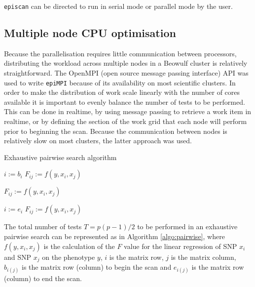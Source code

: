{\tt episcan} can be directed to run in serial mode or parallel mode by the user.


\subsection{Multiple node CPU optimisation}

Because the parallelisation requires little communication between processors, distributing the workload across multiple nodes in a Beowulf cluster is relatively straightforward. The OpenMPI (open source message passing interface) API was used to write {\tt epiMPI} because of its availability on most scientific clusters. In order to make the distribution of work scale linearly with the number of cores available it is important to evenly balance the number of tests to be performed. This can be done in realtime, by using message passing to retrieve a work item in realtime, or by defining the section of the work grid that each node will perform prior to beginning the scan. Because the communication between nodes is relatively slow on most clusters, the latter approach was used.

\begin{algorithm}
\caption{Exhaustive pairwise search algorithm}
\label{algo:pairwise}
\begin{algorithmic}

\STATE $i:= b_i$
\STATE $F_{ij}:= f(y, x_i, x_j)$  
\ENDFOR

\STATE $F_{ij}:= f(y, x_i, x_j)$ 
\ENDFOR
\ENDFOR

\STATE $i:= e_i$
\STATE $F_{ij}:= f(y, x_i, x_j)$ 
\ENDFOR

\end{algorithmic}
\end{algorithm}

The total number of tests $T = p(p-1) / 2$ to be performed in an exhaustive pairwise search can be represented as in Algorithm \ref{algo:pairwise}, where $f(y, x_i, x_j)$ is the calculation of the $F$ value for the linear regression of SNP $x_i$ and SNP $x_j$ on the phenotype $y$, $i$ is the matrix row, $j$ is the matrix column, $b_{i(j)}$ is the matrix row (column) to begin the scan and $e_{i(j)}$ is the matrix row (column) to end the scan. 


